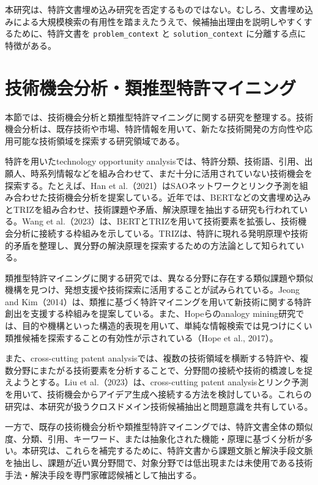 本研究は、特許文書埋め込み研究を否定するものではない。むしろ、文書埋め込みによる大規模検索の有用性を踏まえたうえで、候補抽出理由を説明しやすくするために、特許文書を \texttt{problem\_context} と \texttt{solution\_context} に分離する点に特徴がある。

\section{技術機会分析・類推型特許マイニング}

本節では、技術機会分析と類推型特許マイニングに関する研究を整理する。技術機会分析は、既存技術や市場、特許情報を用いて、新たな技術開発の方向性や応用可能な技術領域を探索する研究領域である。

特許を用いたtechnology opportunity analysisでは、特許分類、技術語、引用、出願人、時系列情報などを組み合わせて、まだ十分に活用されていない技術機会を探索する。たとえば、Han et al.（2021）はSAOネットワークとリンク予測を組み合わせた技術機会分析を提案している。近年では、BERTなどの文書埋め込みとTRIZを組み合わせ、技術課題や矛盾、解決原理を抽出する研究も行われている。Wang et al.（2023）は、BERTとTRIZを用いて技術要素を拡張し、技術機会分析に接続する枠組みを示している。TRIZは、特許に現れる発明原理や技術的矛盾を整理し、異分野の解決原理を探索するための方法論として知られている。

類推型特許マイニングに関する研究では、異なる分野に存在する類似課題や類似機構を見つけ、発想支援や技術探索に活用することが試みられている。Jeong and Kim（2014）は、類推に基づく特許マイニングを用いて新技術に関する特許創出を支援する枠組みを提案している。また、Hopeらのanalogy mining研究では、目的や機構といった構造的表現を用いて、単純な情報検索では見つけにくい類推候補を探索することの有効性が示されている（Hope et al., 2017）。

また、cross-cutting patent analysisでは、複数の技術領域を横断する特許や、複数分野にまたがる技術要素を分析することで、分野間の接続や技術的橋渡しを捉えようとする。Liu et al.（2023）は、cross-cutting patent analysisとリンク予測を用いて、技術機会からアイデア生成へ接続する方法を検討している。これらの研究は、本研究が扱うクロスドメイン技術候補抽出と問題意識を共有している。

一方で、既存の技術機会分析や類推型特許マイニングでは、特許文書全体の類似度、分類、引用、キーワード、または抽象化された機能・原理に基づく分析が多い。本研究は、これらを補完するために、特許文書から課題文脈と解決手段文脈を抽出し、課題が近い異分野間で、対象分野では低出現または未使用である技術手法・解決手段を専門家確認候補として抽出する。

